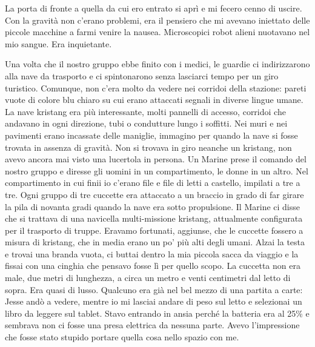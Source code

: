 La porta di fronte a quella da cui ero entrato si aprì e mi fecero cenno
di uscire. Con la gravità non c'erano problemi, era il pensiero che mi
avevano iniettato delle piccole macchine a farmi venire la nausea.
Microscopici robot alieni nuotavano nel mio sangue. Era inquietante.

\hfill\break

Una volta che il nostro gruppo ebbe finito con i medici, le guardie ci
indirizzarono alla nave da trasporto e ci spintonarono senza lasciarci
tempo per un giro turistico. Comunque, non c'era molto da vedere nei
corridoi della stazione: pareti vuote di colore blu chiaro su cui erano
attaccati segnali in diverse lingue umane. La nave kristang era più
interessante, molti pannelli di accesso, corridoi che andavano in ogni
direzione, tubi o condutture lungo i soffitti. Nei muri e nei pavimenti
erano incassate delle maniglie, immagino per quando la nave si fosse
trovata in assenza di gravità. Non si trovava in giro neanche un
kristang, non avevo ancora mai visto una lucertola in persona. Un Marine
prese il comando del nostro gruppo e diresse gli uomini in un
compartimento, le donne in un altro. Nel compartimento in cui finii io
c'erano file e file di letti a castello, impilati a tre a tre. Ogni
gruppo di tre cuccette era attaccato a un braccio in grado di far girare
la pila di novanta gradi quando la nave era sotto propulsione. Il Marine
ci disse che si trattava di una navicella multi-missione kristang,
attualmente configurata per il trasporto di truppe. Eravamo fortunati,
aggiunse, che le cuccette fossero a misura di kristang, che in media
erano un po' più alti degli umani. Alzai la testa e trovai una branda
vuota, ci buttai dentro la mia piccola sacca da viaggio e la fissai con
una cinghia che pensavo fosse lì per quello scopo. La cuccetta non era
male, due metri di lunghezza, a circa un metro e venti centimetri dal
letto di sopra. Era quasi di lusso. Qualcuno era già nel bel mezzo di
una partita a carte: Jesse andò a vedere, mentre io mi lasciai andare di
peso sul letto e selezionai un libro da leggere sul tablet. Stavo
entrando in ansia perché la batteria era al 25\% e sembrava non ci fosse
una presa elettrica da nessuna parte. Avevo l'impressione che fosse
stato stupido portare quella cosa nello spazio con me.

